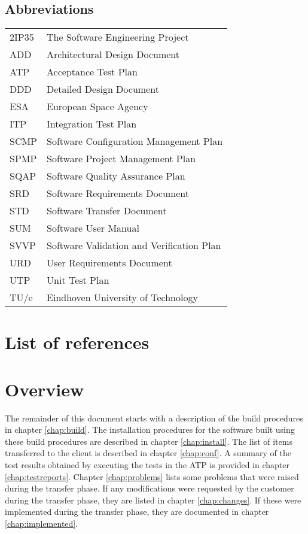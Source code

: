 \subsection{Abbreviations}
\begin{tabular}{l|l}
2IP35 & The Software Engineering Project \\
ADD & Architectural Design Document \\
ATP & Acceptance Test Plan \\
DDD & Detailed Design Document \\
ESA & European Space Agency \\
ITP & Integration Test Plan \\
SCMP & Software Configuration Management Plan \\
SPMP & Software Project Management Plan \\
SQAP & Software Quality Assurance Plan \\
SRD & Software Requirements Document \\
STD & Software Transfer Document \\
SUM & Software User Manual \\
SVVP & Software Validation and Verification Plan \\
URD & User Requirements Document \\
UTP & Unit Test Plan \\
TU/e  & Eindhoven University of Technology \\
\end{tabular}

\section{List of references}


\section{Overview}
The remainder of this document starts with a description of the build procedures in chapter \ref{chap:build}. The installation procedures for the software built using these build procedures are described in chapter \ref{chap:install}. The list of items transferred to the client is described in chapter \ref{chap:conf}. A summary of the test results obtained by executing the tests in the ATP \cite{atp} is provided in chapter \ref{chap:testreports}. Chapter \ref{chap:problems} lists some problems that were raised during the transfer phase. If any modifications were requested by the customer during the transfer phase, they are listed in chapter \ref{chap:changes}. If these were implemented during the transfer phase, they are documented in chapter \ref{chap:implemented}.
